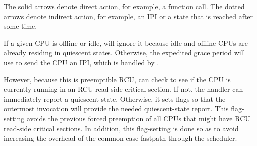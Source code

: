 \begin{center}
\end{center}

The solid arrows denote direct action, for example, a function call.
The dotted arrows denote indirect action, for example, an IPI
or a state that is reached after some time.

If a given CPU is offline or idle, 
will ignore it because idle and offline CPUs are already residing
in quiescent states.
Otherwise, the expedited grace period will use
 to send the CPU an IPI, which
is handled by .

However, because this is preemptible RCU, 
can check to see if the CPU is currently running in an RCU read-side
critical section.
If not, the handler can immediately report a quiescent state.
Otherwise, it sets flags so that the outermost 
invocation will provide the needed quiescent-state report.
This flag-setting avoids the previous forced preemption of all
CPUs that might have RCU read-side critical sections.
In addition, this flag-setting is done so as to avoid increasing
the overhead of the common-case fastpath through the scheduler.

